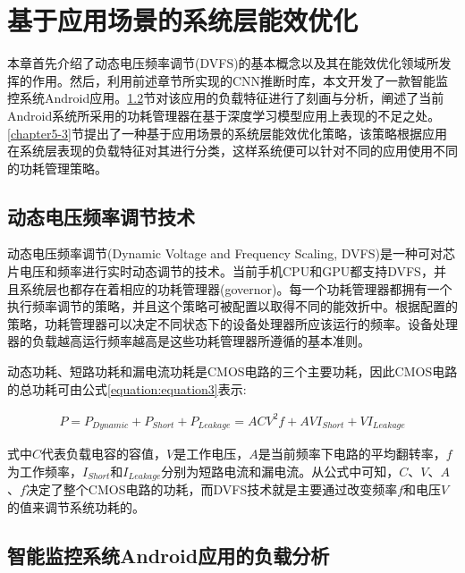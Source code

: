\chapter{基于应用场景的系统层能效优化}

本章首先介绍了动态电压频率调节(DVFS)的基本概念以及其在能效优化领域所发挥的作用。然后，利用前述章节所实现的CNN推断时库，本文开发了一款智能监控系统Android应用。\ref{chapter5-2}节对该应用的负载特征进行了刻画与分析，阐述了当前Android系统所采用的功耗管理器在基于深度学习模型应用上表现的不足之处。\ref{chapter5-3}节提出了一种基于应用场景的系统层能效优化策略，该策略根据应用在系统层表现的负载特征对其进行分类，这样系统便可以针对不同的应用使用不同的功耗管理策略。

\section{动态电压频率调节技术}

动态电压频率调节(Dynamic Voltage and Frequency Scaling, DVFS)是一种可对芯片电压和频率进行实时动态调节的技术。当前手机CPU和GPU都支持DVFS，并且系统层也都存在着相应的功耗管理器(governor)。每一个功耗管理器都拥有一个执行频率调节的策略，并且这个策略可被配置以取得不同的能效折中。根据配置的策略，功耗管理器可以决定不同状态下的设备处理器所应该运行的频率。设备处理器的负载越高运行频率越高是这些功耗管理器所遵循的基本准则。

动态功耗\cite{benini1999policy}、短路功耗\cite{周宽久2010嵌入式软硬件低功耗优化研究综述倡}和漏电流功耗\cite{you2006compilers}是CMOS电路的三个主要功耗，因此CMOS电路的总功耗可由公式\ref{equation:equation3}表示:

\begin{equation}
     \label{equation:equation3}
     \begin{aligned}
        P = P_{Dynamic} + P_{Short} + P_{Leakage}
         = ACV^2f +  AVI_{Short} + VI_{Leakage}
     \end{aligned}
\end{equation}

式中$C$代表负载电容的容值，$V$是工作电压，$A$是当前频率下电路的平均翻转率，$f$为工作频率，$I_{Short}$和$I_{Leakage}$分别为短路电流和漏电流。从公式中可知，$C$、$V$、$A$、$f$决定了整个CMOS电路的功耗，而DVFS技术就是主要通过改变频率$f$和电压$V$的值来调节系统功耗的。


\section{智能监控系统Android应用的负载分析}
\label{chapter5-2}


